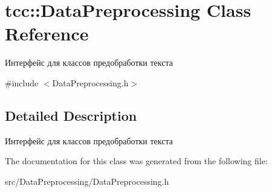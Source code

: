\hypertarget{classtcc_1_1_data_preprocessing}{}\section{tcc\+:\+:Data\+Preprocessing Class Reference}
\label{classtcc_1_1_data_preprocessing}


Интерфейс для классов предобработки текста  




{\ttfamily \#include $<$Data\+Preprocessing.\+h$>$}



\subsection{Detailed Description}
Интерфейс для классов предобработки текста 

The documentation for this class was generated from the following file\+:\begin{DoxyCompactItemize}
\item 
src/\+Data\+Preprocessing/Data\+Preprocessing.\+h\end{DoxyCompactItemize}
